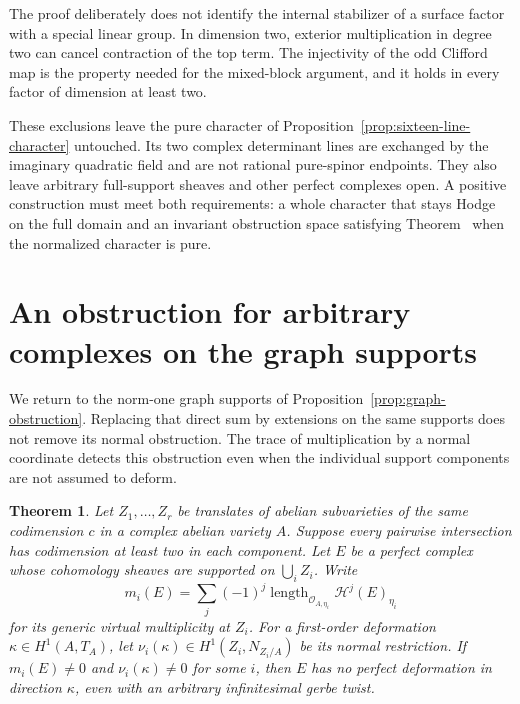 \documentclass[11pt]{article}
\newtheorem{theorem}{Theorem}[section]
\theoremstyle{definition}
\theoremstyle{remark}
\begin{document}
The proof deliberately does not identify the internal stabilizer
of a surface factor with a special linear group. In dimension two,
exterior multiplication in degree two can cancel contraction of the
top term. The injectivity of the odd Clifford map is the property
needed for the mixed-block argument, and it holds in every factor
of dimension at least two.

These exclusions leave the pure character of Proposition~\ref{prop:sixteen-line-character} untouched. Its two complex determinant lines are exchanged by the imaginary quadratic field and are not rational pure-spinor endpoints. They also leave arbitrary full-support sheaves and other perfect complexes open. A positive construction must meet both requirements: a whole character that stays Hodge on the full domain and an invariant obstruction space satisfying Theorem~ when the normalized character is pure.
\section{An obstruction for arbitrary complexes on the graph supports}
\label{sec:localized-support}
We return to the norm-one graph supports of Proposition~\ref{prop:graph-obstruction}. Replacing that direct sum by extensions on the same supports does not remove its normal obstruction. The trace of multiplication by a normal coordinate detects this obstruction even when the individual support components are not assumed to deform.

\begin{theorem}\label{thm:localized-support}
Let $Z_1,\ldots,Z_r$ be translates of abelian subvarieties of the same codimension $c$ in a complex abelian variety $A$. Suppose every pairwise intersection has codimension at least two in each component. Let $E$ be a perfect complex whose cohomology sheaves are supported on $\bigcup_iZ_i$. Write
\[
 m_i(E)=\sum_j(-1)^j
 \operatorname{length}_{\mathcal O_{A,\eta_i}}
 \mathcal H^j(E)_{\eta_i}
\]
for its generic virtual multiplicity at $Z_i$. For a first-order deformation $\kappa\in H^1(A,T_A)$, let $\nu_i(\kappa)\in H^1(Z_i,N_{Z_i/A})$ be its normal restriction. If $m_i(E)\ne0$ and $\nu_i(\kappa)\ne0$ for some $i$, then $E$ has no perfect deformation in direction $\kappa$, even with an arbitrary infinitesimal gerbe twist.
\end{theorem}
\end{document}
